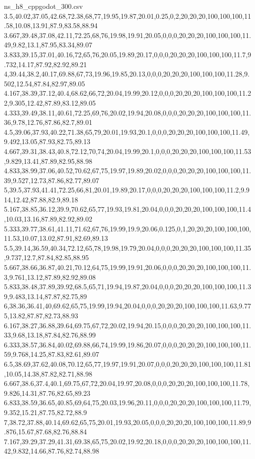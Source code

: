 \begin{filecontents*}[overwrite]{ns_h8_cppgodot_300.csv}
3.5,40.02,37.05,42.68,72.38,68,77,19.95,19.87,20.01,0.25,0,2,20,20,20,100,100,100,11.58,10.08,13.91,87.9,83.58,88.94
3.667,39.48,37.08,42.11,72.25,68,76,19.98,19.91,20.05,0,0,0,20,20,20,100,100,100,11.49,9.82,13.1,87.95,83.34,89.07
3.833,39.15,37.01,40.16,72,65,76,20.05,19.89,20.17,0,0,0,20,20,20,100,100,100,11.7,9.732,14.17,87.92,82.92,89.21
4,39.44,38.2,40.17,69.88,67,73,19.96,19.85,20.13,0,0,0,20,20,20,100,100,100,11.28,9.502,12.54,87.84,82.97,89.05
4.167,38.39,37.12,40.4,68.62,66,72,20.04,19.99,20.12,0,0,0,20,20,20,100,100,100,11.22,9.305,12.42,87.89,83.12,89.05
4.333,39.49,38.11,40.61,72.25,69,76,20.02,19.94,20.08,0,0,0,20,20,20,100,100,100,11.36,9.78,12.76,87.86,82.7,89.01
4.5,39.06,37.93,40.22,71.38,65,79,20.01,19.93,20.1,0,0,0,20,20,20,100,100,100,11.49,9.492,13.05,87.93,82.75,89.13
4.667,39.31,38.43,40.8,72.12,70,74,20.04,19.99,20.1,0,0,0,20,20,20,100,100,100,11.53,9.829,13.41,87.89,82.95,88.98
4.833,38.99,37.06,40.52,70.62,67,75,19.97,19.89,20.02,0,0,0,20,20,20,100,100,100,11.39,9.527,12.73,87.86,82.77,89.07
5,39.5,37.93,41.41,72.25,66,81,20.01,19.89,20.17,0,0,0,20,20,20,100,100,100,11.2,9.914,12.42,87.88,82.9,89.18
5.167,38.85,36.12,39.9,70.62,65,77,19.93,19.81,20.04,0,0,0,20,20,20,100,100,100,11.4,10.03,13.16,87.89,82.92,89.02
5.333,39.77,38.61,41.11,71.62,67,76,19.99,19.9,20.06,0.125,0,1,20,20,20,100,100,100,11.53,10.07,13.02,87.91,82.69,89.13
5.5,39.14,36.59,40.34,72.12,65,78,19.98,19.79,20.04,0,0,0,20,20,20,100,100,100,11.35,9.737,12.7,87.84,82.85,88.95
5.667,38.66,36.87,40.21,70.12,64,75,19.99,19.91,20.06,0,0,0,20,20,20,100,100,100,11.3,9.761,13.12,87.89,82.92,89.08
5.833,38.48,37.89,39.92,68.5,65,71,19.94,19.87,20.04,0,0,0,20,20,20,100,100,100,11.39,9.483,13.14,87.87,82.75,89
6,38.36,36.41,40,69.62,65,75,19.99,19.94,20.04,0,0,0,20,20,20,100,100,100,11.63,9.775,13.82,87.87,82.73,88.93
6.167,38.27,36.88,39.64,69.75,67,72,20.02,19.94,20.15,0,0,0,20,20,20,100,100,100,11.33,9.68,13.18,87.84,82.76,88.99
6.333,38.57,36.84,40.02,69.88,66,74,19.99,19.86,20.07,0,0,0,20,20,20,100,100,100,11.59,9.768,14.25,87.83,82.61,89.07
6.5,38.69,37.62,40.08,70.12,65,77,19.97,19.91,20.07,0,0,0,20,20,20,100,100,100,11.81,10.05,14.38,87.82,82.71,88.98
6.667,38.6,37.4,40.1,69.75,67,72,20.04,19.97,20.08,0,0,0,20,20,20,100,100,100,11.78,9.826,14.31,87.76,82.65,89.23
6.833,38.59,36.65,40.85,69,64,75,20.03,19.96,20.11,0,0,0,20,20,20,100,100,100,11.79,9.352,15.21,87.75,82.72,88.9
7,38.72,37.88,40.14,69.62,65,75,20.01,19.93,20.05,0,0,0,20,20,20,100,100,100,11.89,9.876,15.67,87.68,82.76,88.84
7.167,39.29,37.29,41.31,69.38,65,75,20.02,19.92,20.18,0,0,0,20,20,20,100,100,100,11.42,9.832,14.66,87.76,82.74,88.98

\end{filecontents*}
